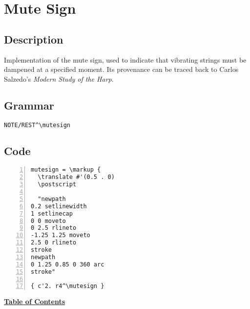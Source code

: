 \vfill \break







\section {Mute Sign}
\hfill

\subsection{Description}
Implementation of the mute sign, used to indicate that vibrating strings must be dampened at a specified moment. Its provenance can be traced back to Carlos Salzedo's \textit{Modern Study of the Harp}.\autocite[19]{RN4} 

\subsection{Grammar}
\begin{verbatim}
NOTE/REST^\mutesign
\end{verbatim}
\subsection{Code}
\begin{Verbatim}[numbers=left,xleftmargin=5mm]
mutesign = \markup {
  \translate #'(0.5 . 0)
  \postscript

  "newpath
0.2 setlinewidth
1 setlinecap
0 0 moveto
0 2.5 rlineto
-1.25 1.25 moveto
2.5 0 rlineto
stroke
newpath
0 1.25 0.85 0 360 arc
stroke"

{ c'2. r4^\mutesign }

\end{Verbatim}
\hyperref[sec:toc]{\textbf{Table of Contents}}

\vfill \break


